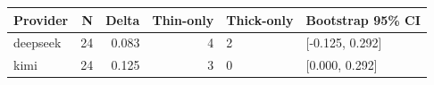 \begin{tabular}{lrrrll}
\toprule
Provider & N & Delta & Thin-only & Thick-only & Bootstrap 95\% CI \\
\midrule
deepseek & 24 & 0.083 & 4 & 2 & [-0.125, 0.292] \\
kimi & 24 & 0.125 & 3 & 0 & [0.000, 0.292] \\
\bottomrule
\end{tabular}
